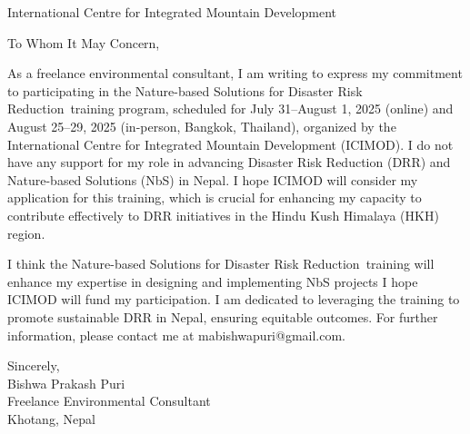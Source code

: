 \documentclass[12pt]{letter}
\newcommand{\applicantname}{Bishwa Prakash Puri}
\newcommand{\trainingtitle}{Nature-based Solutions for Disaster Risk Reduction}
\newcommand{\applicantaddress}{Khotang, Nepal}
\begin{document}
\begin{letter}{International Centre for Integrated Mountain Development\\}

\opening{To Whom It May Concern,}

As a freelance environmental consultant, I am writing to express my commitment to participating in the \trainingtitle\ training program, scheduled for July 31–August 1, 2025 (online) and August 25–29, 2025 (in-person, Bangkok, Thailand), organized by the International Centre for Integrated Mountain Development (ICIMOD). I do not have any support for my role in advancing Disaster Risk Reduction (DRR) and Nature-based Solutions (NbS) in Nepal. I hope ICIMOD will consider my application for this training, which is crucial for enhancing my capacity to contribute effectively to DRR initiatives in the Hindu Kush Himalaya (HKH) region.


I think the \trainingtitle\ training will enhance my expertise in designing and implementing NbS projects I hope ICIMOD will fund my participation. I am dedicated to leveraging the training to promote sustainable DRR in Nepal, ensuring equitable outcomes. For further information, please contact me at mabishwapuri@gmail.com.

\closing{Sincerely,\\
\applicantname\\
Freelance Environmental Consultant\\
\applicantaddress}

\end{letter}
\end{document}
